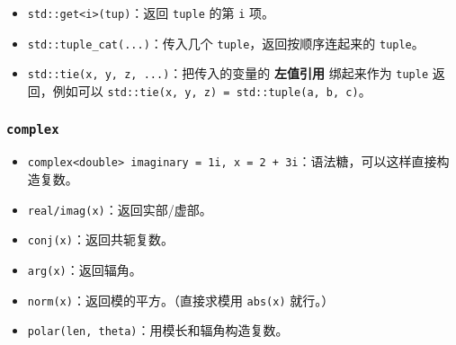 \begin{itemize}
	\item \texttt{std::get<i>(tup)}：返回 \texttt{tuple} 的第 \texttt{i} 项。
	\item \texttt{std::tuple_cat(...)}：传入几个 \texttt{tuple}，返回按顺序连起来的 \texttt{tuple}。
	\item \texttt{std::tie(x, y, z, ...)}：把传入的变量的 \textbf{左值引用} 绑起来作为 \texttt{tuple} 返回，例如可以 \texttt{std::tie(x, y, z) = std::tuple(a, b, c)}。
\end{itemize}

\subsubsection[complex]{\texttt{complex}}

\begin{itemize}
	\item \texttt{complex<double> imaginary = 1i, x = 2 + 3i}：语法糖，可以这样直接构造复数。
	\item \texttt{real/imag(x)}：返回实部/虚部。
	\item \texttt{conj(x)}：返回共轭复数。
	\item \texttt{arg(x)}：返回辐角。
	\item \texttt{norm(x)}：返回模的平方。（直接求模用 \texttt{abs(x)} 就行。）
	\item \texttt{polar(len, theta)}：用模长和辐角构造复数。
\end{itemize}
